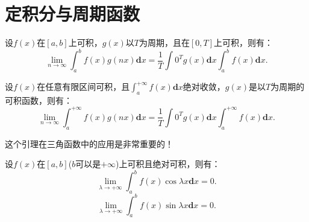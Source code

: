 \section{定积分与周期函数}

\begin{proposition}
	设$f(x)$在$[a,b]$上可积，$g(x)$以$T$为周期，且在$[0,T]$上可积，则有：
	\begin{equation}
		\displaystyle\lim_{n\to\infty}\int_{a}^{b}f(x)g(nx)\textbf{d}x = \dfrac{1}{T}\int{0}^{T}g(x)\textbf{d}x\int_{a}^{b}f(x)\textbf{d}x.
	\end{equation}
\end{proposition}



\begin{proposition}
	设$f(x)$在任意有限区间可积，且$\int_{a}^{+\infty}f(x)\textbf{d}x$绝对收敛，$g(x)$是以$T$为周期的可积函数，则有：
	\begin{equation}
			\displaystyle\lim_{n\to\infty}\int_{a}^{+\infty}f(x)g(nx)\textbf{d}x = \dfrac{1}{T}\int{0}^{T}g(x)\textbf{d}x\int_{a}^{+\infty}f(x)\textbf{d}x.
	\end{equation}
\end{proposition}


这个引理在三角函数中的应用是非常重要的！

\begin{corollary}
	设$f(x)$在$[a,b]$($b$可以是$+\infty$)上可积且绝对可积，则有：
	\begin{equation}
		\displaystyle\lim_{\lambda\to +\infty}\int_{a}^{b}f(x)\cos{\lambda x}\textbf{d}x = 0.
	\end{equation}
	\begin{equation}
		\displaystyle\lim_{\lambda\to +\infty}\int_{a}^{b}f(x)\sin{\lambda x}\textbf{d}x = 0.
	\end{equation}
\end{corollary}